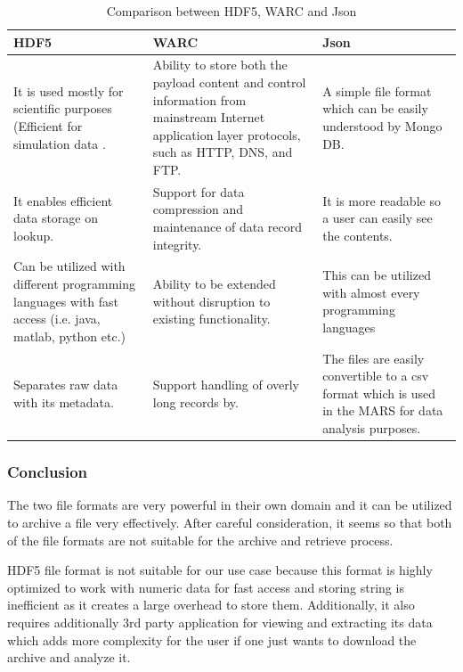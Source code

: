  \begin{table}[H]
    \centering
    \begin{tabular}{|p{5cm}|p{5cm}|p{5cm}|}
        \hline
            \textbf{HDF5}  & \textbf{WARC}&\textbf{Json}\\
        \hline
            It is used mostly for scientific purposes (Efficient
            for simulation data \cite[p.~11]{Savic2007}. & 
            Ability to store both the payload content and control information from mainstream Internet application layer protocols, such as
            HTTP, DNS, and FTP. & A simple file format which can be easily understood by Mongo DB.\\
        \hline
            It enables efficient data storage on lookup.
            &  
            Support for data compression and maintenance of
             data record integrity. & It is more readable so a user can easily see the contents.\\
        \hline
        Can be utilized with different programming languages with fast access (i.e. java, matlab, python etc.) &  
                Ability to be extended without disruption
                to existing functionality. & This can be utilized with almost every programming languages\\
        \hline
        Separates raw data with its metadata. & Support handling of overly long records by.& The files are easily convertible to a csv format which is used in the MARS
        for data analysis purposes. \\        
        \hline
    \end{tabular}
    \caption{Comparison between HDF5, WARC and Json}
    \label{table:Hdf5vsWARC}     
\end{table} 

\subsubsection{Conclusion}
    The two file formats are very powerful in their own domain and it can be utilized to archive a file very effectively. After careful consideration,  
    it seems so that both of the file formats are not suitable for the archive and retrieve process. 

    HDF5 file format is not suitable for our use case because this format is highly optimized to work with
    numeric data for fast access and storing string is inefficient as it creates a large overhead to store them. 
    Additionally, it also requires additionally 3rd party application for viewing and extracting its data which 
    adds more complexity for the user if one just wants to download the archive and analyze it. 

